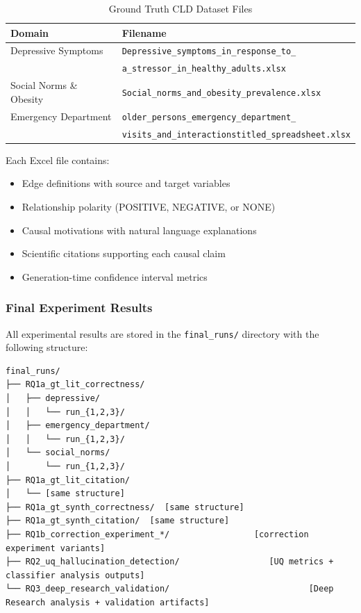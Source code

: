 \documentclass{article}
\begin{document}
\begin{table}[H]
\centering
\caption{Ground Truth CLD Dataset Files}
\label{tab:gt_files}
\begin{tabular}{ll}
\toprule
\textbf{Domain} & \textbf{Filename} \\
\midrule
Depressive Symptoms & \texttt{Depressive\_symptoms\_in\_response\_to\_} \\
                    & \texttt{a\_stressor\_in\_healthy\_adults.xlsx} \\
Social Norms \& Obesity & \texttt{Social\_norms\_and\_obesity\_prevalence.xlsx} \\
Emergency Department & \texttt{older\_persons\_emergency\_department\_} \\
                     & \texttt{visits\_and\_interactionstitled\_spreadsheet.xlsx} \\
\bottomrule
\end{tabular}
\end{table}

Each Excel file contains:
\begin{itemize}
    \item Edge definitions with source and target variables
    \item Relationship polarity (POSITIVE, NEGATIVE, or NONE)
    \item Causal motivations with natural language explanations
    \item Scientific citations supporting each causal claim
    \item Generation-time confidence interval metrics
\end{itemize}

\subsubsection{Final Experiment Results}

All experimental results are stored in the \texttt{final\_runs/} directory with the following structure:

\begin{verbatim}
final_runs/
├── RQ1a_gt_lit_correctness/
│   ├── depressive/
│   │   └── run_{1,2,3}/
│   ├── emergency_department/
│   │   └── run_{1,2,3}/
│   └── social_norms/
│       └── run_{1,2,3}/
├── RQ1a_gt_lit_citation/
│   └── [same structure]
├── RQ1a_gt_synth_correctness/  [same structure]
├── RQ1a_gt_synth_citation/  [same structure]
├── RQ1b_correction_experiment_*/                 [correction experiment variants]
├── RQ2_uq_hallucination_detection/                  [UQ metrics + classifier analysis outputs]
└── RQ3_deep_research_validation/                            [Deep Research analysis + validation artifacts]
\end{verbatim}
\end{document}
